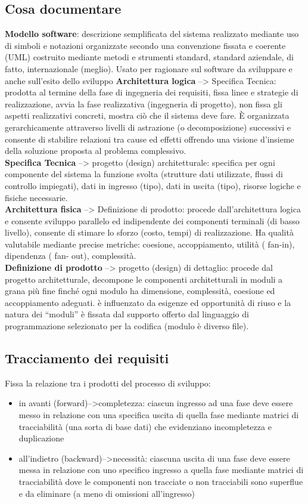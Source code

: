 \subsection{Cosa documentare}
\textbf{Modello software}: descrizione semplificata del sistema realizzato mediante uso di simboli e notazioni organizzate secondo una convenzione fissata e coerente (UML) costruito mediante metodi e strumenti standard, standard aziendale, di fatto, internazionale (meglio). Usato per ragionare sul software da sviluppare e anche sull'esito dello sviluppo
\textbf{Architettura logica} --> Specifica Tecnica: prodotta al termine della fase di ingegneria dei requisiti, fissa linee e strategie di realizzazione, avvia la fase realizzativa (ingegneria di progetto), non fissa gli aspetti realizzativi concreti, mostra ciò che il sistema deve fare. \`E organizzata gerarchicamente attraverso livelli di astrazione (o decomposizione) successivi e consente di stabilire relazioni tra cause ed effetti offrendo una visione d'insieme della soluzione proposta al problema complessivo.\\
\textbf{Specifica Tecnica} --> progetto (design) architetturale: specifica per ogni componente del sistema la funzione svolta (strutture dati utilizzate, flussi di controllo impiegati), dati in ingresso (tipo), dati in uscita (tipo), risorse logiche e fisiche necessarie.\\
\textbf{Architettura fisica} --> Definizione di prodotto: procede dall'architettura logica e consente sviluppo parallelo ed indipendente dei componenti terminali (di basso livello), consente di stimare lo sforzo (costo, tempi) di realizzazione. Ha qualità valutabile mediante precise metriche: coesione, accoppiamento, utilità ( fan-in), dipendenza ( fan- out), complessità.\\
\textbf{Definizione di prodotto} --> progetto (design) di dettaglio: procede dal progetto architetturale, decompone le componenti architetturali in moduli a grana più fine finché ogni modulo ha dimensione, complessità, coesione ed accoppiamento adeguati.
è influenzato da esigenze ed opportunità di riuso e la natura dei ``moduli'' è fissata dal supporto offerto dal linguaggio di programmazione selezionato per la codifica (modulo è diverso file).\\

\subsection{Tracciamento dei requisiti}
Fissa la relazione tra i prodotti del processo di sviluppo:
\begin{itemize}
\item in avanti (forward)-->completezza: ciascun ingresso ad una fase deve essere messo in relazione con una specifica uscita di quella fase mediante matrici di tracciabilità (una sorta di base dati) che evidenziano incompletezza e duplicazione
\item all'indietro (backward)-->necessità: ciascuna uscita di una fase deve essere messa in relazione con uno specifico ingresso a quella fase mediante matrici di tracciabilità dove le componenti non tracciate o non tracciabili sono superflue e da eliminare (a meno di omissioni all'ingresso)
\end{itemize}

